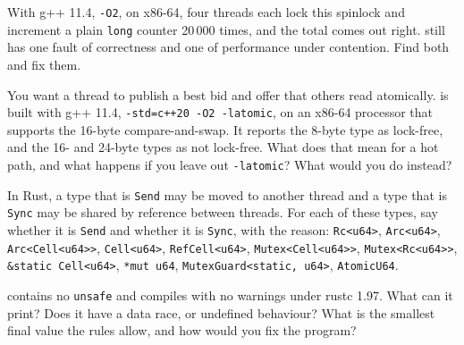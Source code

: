 \begin{question}\label{iq:iv3:low-latency:13}
With g++ 11.4, \texttt{-O2}, on x86-64, four threads each lock this spinlock and increment a plain \texttt{long} counter 20\,000 times, and the total comes out right.  still has one fault of correctness and one of performance under contention. Find both and fix them.
\label{lst:iv3:ll:spinlock}
\end{question}

\begin{question}\label{iq:iv3:low-latency:14}
You want a thread to publish a best bid and offer that others read atomically.  is built with g++ 11.4, \texttt{-std=c++20 -O2 -latomic}, on an x86-64 processor that supports the 16-byte compare-and-swap. It reports the 8-byte type as lock-free, and the 16- and 24-byte types as not lock-free. What does that mean for a hot path, and what happens if you leave out \texttt{-latomic}? What would you do instead?
\label{lst:iv3:ll:quote}
\end{question}

\begin{question}\label{iq:iv3:low-latency:15}
In Rust, a type that is \texttt{Send} may be moved to another thread and a type that is \texttt{Sync} may be shared by reference between threads. For each of these types, say whether it is \texttt{Send} and whether it is \texttt{Sync}, with the reason: \texttt{Rc<u64>}, \texttt{Arc<u64>}, \texttt{Arc<Cell<u64>{}>}, \texttt{Cell<u64>}, \texttt{RefCell<u64>}, \texttt{Mutex<Cell<u64>{}>}, \texttt{Mutex<Rc<u64>{}>}, \texttt{\&\textquotesingle{}static Cell<u64>}, \texttt{*mut u64}, \texttt{MutexGuard<\textquotesingle{}static, u64>}, \texttt{AtomicU64}.
\end{question}

\begin{question}\label{iq:iv3:low-latency:16}
 contains no \texttt{unsafe} and compiles with no warnings under rustc 1.97. What can it print? Does it have a data race, or undefined behaviour? What is the smallest final value the rules allow, and how would you fix the program?
\label{lst:iv3:ll:lost}
\end{question}

